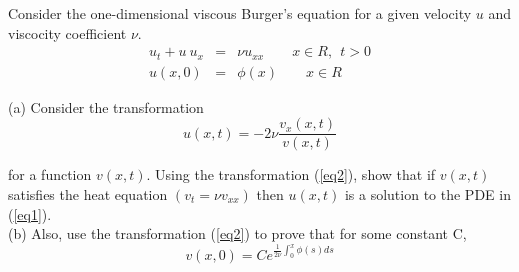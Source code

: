 Consider the one-dimensional viscous Burger's equation for a given velocity $u$ and viscocity coefficient $\nu$.
\begin{eqnarray}\label{eq1}  u_t + u\: u_x &=& \nu u_{xx} \qquad  x \in R, \:\: t > 0 \\
u(x, 0) &=& \phi(x) \qquad x \in  R \nonumber
\end{eqnarray}

(a) Consider the transformation
\begin{equation} \label{eq2} u(x, t) = -2\nu \frac{v_x(x, t)}{v(x, t)}\end{equation}

for a function $v(x, t)$. Using the transformation (\ref{eq2}), show that if $v(x, t)$ satisfies
the heat equation $(v_t = \nu v_{xx})$ then $u(x, t)$ is a solution to the PDE in (\ref{eq1}).\\
(b) Also, use the transformation (\ref{eq2}) to prove that for some constant C,
\[v(x, 0) = C e^{\frac{1}{2\nu} \int_0^x \phi(s) ds}\]
